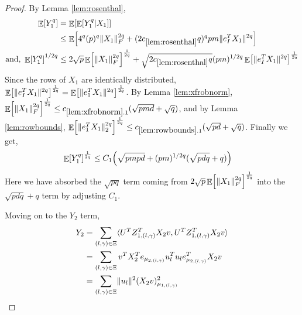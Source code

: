 \documentclass[11pt]{amsart}
\numberwithin{equation}{section}
\numberwithin{equation}{section}
\DeclareMathOperator{\E}{\mathbb{E}}
\DeclarePairedDelimiter{\norm}{\lVert}{\rVert}
\DeclarePairedDelimiter{\ip}{\langle}{\rangle}
\DeclarePairedDelimiter{\paren}{(}{)}
\DeclarePairedDelimiter{\sqbr}{[}{]}
\begin{document}
\begin{proof}
By Lemma \ref{lem:rosenthal}, 
\begin{align*}
    \E \sqbr*{Y_1^q} &= \E \sqbr*{ \E \sqbr*{ Y_1^q \vert X_1 }} \\
    &\le \E \sqbr*{ 4^q (p)^q \norm{X_1}_F^{2q} + (2c_{\ref{lem:rosenthal}}q)^q pm \norm{e^T_I X_1}^{2q} } \\
    \text{and, } \E \sqbr*{Y_1^q}^{1/2q} &\le 2 \sqrt{p} \E \sqbr*{\norm{X_1}_F^{2q}}^\frac{1}{2q} + \sqrt{2c_{\ref{lem:rosenthal}}q} (pm)^{1/2q} \E \sqbr*{\norm{e_I^TX_1}^{2q}}^\frac{1}{2q} 
\end{align*}
Since the rows of $X_1$ are identically distributed, $\E \sqbr*{\norm{e_I^TX_1}^{2q}}^\frac{1}{2q} = \E \sqbr*{\norm{e_1^TX_1}^{2q}}^\frac{1}{2q}$.
By Lemma \ref{lem:xfrobnorm}, $\E \sqbr*{\norm{X_1}_F^{2q}}^\frac{1}{2q} \le c_{\ref{lem:xfrobnorm}.1}(\sqrt{pmd} + \sqrt{q})$,  and by Lemma \ref{lem:rowbounds}, $\E \sqbr*{\norm{e_1^TX_1}_2^{2q}}^\frac{1}{2q} \le c_{\ref{lem:rowbounds}.1} \paren{\sqrt{pd} + \sqrt{q}}$. Finally we get,
\begin{align*}
    \E \sqbr*{Y_1^q}^\frac{1}{2q} &\le C_1 \paren*{\sqrt{pmpd} + (pm)^{1/2q} (\sqrt{pdq} + q) }
\end{align*}
Here we have absorbed the $\sqrt{pq}$ term coming from $2 \sqrt{p} \E \sqbr*{\norm{X_1}_F^{2q}}^\frac{1}{2q}$ into the $\sqrt{pdq} + q$ term by adjusting $C_1$.

Moving on to the $Y_2$ term, 
\begin{align*}
    Y_2 &= \sum_{(l,\gamma)\in \Xi} \ip{U^T Z^T_{1,(l,\gamma)}X_2v,U^TZ^T_{1,(l,\gamma) }X_2v} \\
    &= \sum_{(l,\gamma)\in \Xi} v^T X_2^T  e_{\mu_{2,(l, \gamma)}} u_l^T u_l e_{\mu_{2,(l, \gamma)}}^T X_2 v \\
    &= \sum_{(l,\gamma) \in \Xi} \norm{u_l}^2 (X_2 v)^2_{\mu_{1, (l,\gamma)}} \\
\end{align*}


\end{proof}
\end{document}
